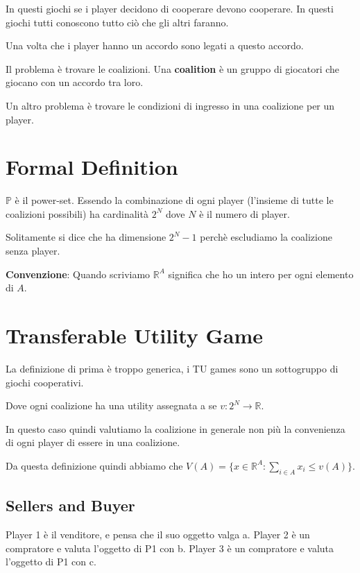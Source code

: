 \documentclass[10pt,a4paper]{report}
\begin{document}
        In questi giochi se i player decidono di cooperare devono cooperare. In questi giochi tutti conoscono tutto ciò che gli altri faranno.

        Una volta che i player hanno un accordo sono legati a questo accordo.

        Il problema è trovare le coalizioni. Una \textbf{coalition} è un gruppo di giocatori che giocano con un accordo tra loro.

        Un altro problema è trovare le condizioni di ingresso in una coalizione per un player.

        \section{Formal Definition}

        $\mathbb{P}$ è il power-set. Essendo la combinazione di ogni player (l'insieme di tutte le coalizioni possibili) ha cardinalità $2^N$ dove $N$ è il numero di player.

        Solitamente si dice che ha dimensione $2^N -1$ perchè escludiamo la coalizione senza player.

        \textbf{Convenzione}: Quando scriviamo $\mathbb{R}^A$ significa che ho un intero per ogni elemento di $A$.

        \section{Transferable Utility Game}

        La definizione di prima è troppo generica, i TU games sono un sottogruppo di giochi cooperativi.

        Dove ogni coalizione ha una utility assegnata a se $v: 2^N \rightarrow \mathbb{R}$.

        In questo caso quindi valutiamo la coalizione in generale non più la convenienza di ogni player di essere in una coalizione.

        Da questa definizione quindi abbiamo che $V(A) = \{ x \in \mathbb{R}^A : \sum_{i \in A} x_i \le v(A)\}$.

        \subsection{Sellers and Buyer}

        Player 1 è il venditore, e pensa che il suo oggetto valga a.
        Player 2 è un compratore e valuta l'oggetto di P1 con b.
        Player 3 è un compratore e valuta l'oggetto di P1 con c.
\end{document}
